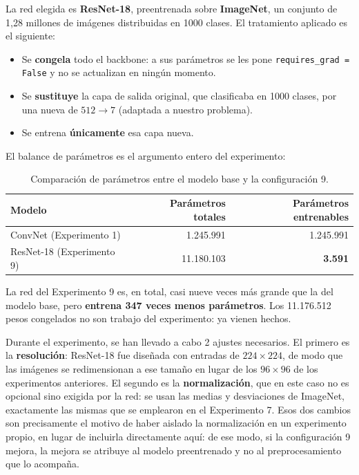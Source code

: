 \documentclass[11pt, a4paper]{article}
\begin{document}
La red elegida es \textbf{ResNet-18}, preentrenada sobre \textbf{ImageNet}, un conjunto de 1,28 millones de imágenes distribuidas en 1000 clases. El tratamiento aplicado es el siguiente:

\begin{itemize}
    \item Se \textbf{congela} todo el backbone: a sus parámetros se les pone \texttt{requires\_grad = False} y no se actualizan en ningún momento.
    \item Se \textbf{sustituye} la capa de salida original, que clasificaba en 1000 clases, por una nueva de $512 \rightarrow 7$ (adaptada a nuestro problema).
    \item Se entrena \textbf{únicamente} esa capa nueva.
\end{itemize}

El balance de parámetros es el argumento entero del experimento:

\begin{table}[H]
\centering
\caption{Comparación de parámetros entre el modelo base y la configuración 9.}
\label{tab:parametros_transfer}
\begin{tabular}{l r r}
\toprule
\textbf{Modelo} & \textbf{Parámetros totales} & \textbf{Parámetros entrenables} \\
\midrule
ConvNet (Experimento 1) & 1.245.991 & 1.245.991 \\
ResNet-18 (Experimento 9) & 11.180.103 & \textbf{3.591} \\
\bottomrule
\end{tabular}
\end{table}

La red del Experimento 9 es, en total, casi nueve veces más grande que la del modelo base, pero \textbf{entrena 347 veces menos parámetros}. Los 11.176.512 pesos congelados no son trabajo del experimento: ya vienen hechos.

Durante el experimento, se han llevado a cabo 2 ajustes necesarios. El primero es la \textbf{resolución}: ResNet-18 fue diseñada con entradas de $224 \times 224$, de modo que las imágenes se redimensionan a ese tamaño en lugar de los $96 \times 96$ de los experimentos anteriores. El segundo es la \textbf{normalización}, que en este caso no es opcional sino exigida por la red: se usan las medias y desviaciones de ImageNet, exactamente las mismas que se emplearon en el Experimento 7. Esos dos cambios son precisamente el motivo de haber aislado la normalización en un experimento propio, en lugar de incluirla directamente aquí: de ese modo, si la configuración 9 mejora, la mejora se atribuye al modelo preentrenado y no al preprocesamiento que lo acompaña.
\end{document}
